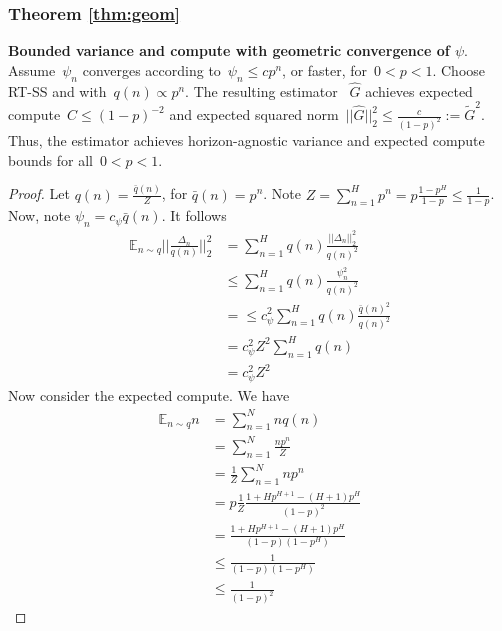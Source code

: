 \subsubsection{Theorem \ref{thm:geom}}
\textbf{Bounded variance and compute with geometric convergence of $\psi$}.
Assume~$\psi_n$ converges according to~${\psi_n \leq c p^n}$, or faster, for~${0 < p < 1}$.
Choose RT-SS and with~${q(n) \propto p^n}$.
The resulting estimator ~$\hat{G}$ achieves expected compute~${C \leq (1-p)^{-2}}$ and expected squared norm~${||\hat{G}||_2^2 \leq \frac{c}{(1-p)^2} := \tilde{G}^2}$.
Thus, the estimator achieves horizon-agnostic variance and expected compute bounds for all~${0 < p < 1}$.
\begin{proof}
Let $q(n) = \frac{\bar{q}(n)}{Z}$, for $\bar{q}(n) = p^n$.
Note $Z = \sum_{n=1}^H p^n = p \frac{1 - p^H}{1 - p} \leq \frac{1}{1 - p}$.
Now, note $\psi_n = c_\psi \bar{q}(n)$. It follows
\begin{align*}
\mathbb{E}_{n\sim q} ||\frac{\Delta_n}{q(n)}||_2^2
&= \sum_{n=1}^H q(n) \frac{||\Delta_n||_2^2}{q(n)^2} \\
&\leq\sum_{n=1}^H q(n) \frac{\psi_n^2}{q(n)^2} \\
&=\leq c_\psi^2 \sum_{n=1}^H q(n) \frac{\bar{q}(n)^2}{q(n)^2}\\
&= c_\psi^2 Z^2 \sum_{n=1}^H q(n)\\
&= c_\psi^2 Z^2
\end{align*}
Now consider the expected compute. We have
\begin{align*}
\mathbb{E}_{n\sim q} n &= \sum_{n=1}^N n q(n)\\
&= \sum_{n=1}^N \frac{n p^n}{Z}\\
&= \frac{1}{Z} \sum_{n=1}^N n p^n\\
&= p \frac{1}{Z} \frac{1 + Hp^{H+1} - (H+1)p^H}{(1-p)^2}\\
&= \frac{1 + Hp^{H+1} - (H+1)p^H}{(1-p)(1-p^H)}\\
&\leq \frac{1}{(1-p)(1-p^H)}\\
&\leq \frac{1}{(1-p)^2}
\end{align*}
\end{proof}

